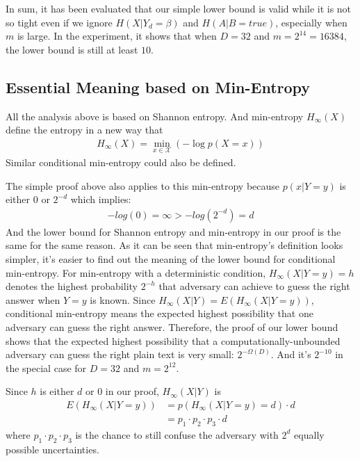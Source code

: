 \documentclass[10pt, conference, compsocconf]{IEEEtran}
\begin{document}
        In sum, it has been evaluated that our simple lower bound
        is valid while it is not so tight even if we ignore
        $H(X | Y_d = \beta)$ and $H(A | B = true)$, especially
        when $m$ is large. In the experiment,
        it shows that when $D = 32$ and $m = 2^{14} = 16384$, the lower bound
        is still at least $10$.

\subsection{Essential Meaning based on Min-Entropy}
    All the analysis above is based on Shannon entropy.
    And min-entropy $H_\infty(X)$ define the entropy in a new way that
    \begin{align*}
        H_\infty(X) = \min_{x \in \mathcal X} \left(-\log p\left(X = x\right) \right)
    \end{align*}
    Similar conditional min-entropy could also be defined.

    The simple proof above also applies to this min-entropy
    because $p(x | Y = y)$ is either $0$ or $2^{-d}$ which implies:
    \begin{align*}
        -log(0) = \infty > -log(2^{-d}) = d
    \end{align*}
    And the lower bound for Shannon entropy and min-entropy
    in our proof is the same for the same reason.
    As it can be seen that min-entropy's definition looks simpler,
    it's easier to find out the meaning of the lower
    bound for conditional min-entropy. For min-entropy with a deterministic condition,
    $H_\infty(X | Y = y) = h$
    denotes the highest probability $2^{-h}$ that adversary can achieve to guess
    the right answer when $Y = y$ is known.
    Since $H_\infty(X | Y) = E\left(H_\infty(X | Y = y)\right)$,
    conditional min-entropy means the expected highest
    possibility that one adversary can guess the right answer.
    Therefore, the proof of our lower bound shows that
    the expected highest possibility that a computationally-unbounded
    adversary can guess the right plain text is very small: $2^{-\Omega(D)}$.
    And it's $2^{-10}$ in the special case for $D = 32$ and $m = 2^{12}$.

    Since $h$ is either $d$ or $0$ in our proof,
    $H_\infty(X | Y)$ is
    \begin{align*}
        E\left(H_\infty(X | Y = y)\right) &= p\left(H_\infty(X | Y = y) = d\right) \cdot d\\
         &= p_1 \cdot p_2 \cdot p_3 \cdot d
    \end{align*}
    where $p_1 \cdot p_2 \cdot p_3$ is the chance to still confuse the adversary with
    $2^d$ equally possible uncertainties.
\end{document}
